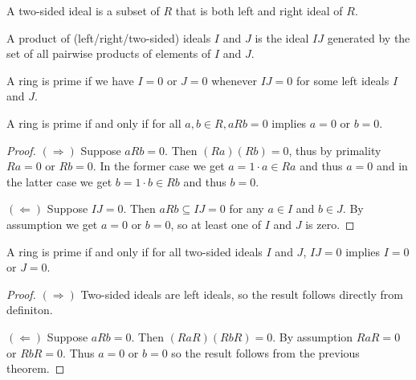 \begin{definition}
  \label{def:two_sided_ideal}
  A two-sided ideal is a subset of $R$ that is both left and right ideal of $R$.
\end{definition}

\begin{definition}
  \label{def:product_of_ideals}
  A product of (left/right/two-sided) ideals $I$ and $J$ is the ideal $IJ$ generated by the set of all pairwise products of elements of $I$ and $J$.
\end{definition}

\begin{definition}
  \label{def:IsPrimeRing}
  \leanok
  A ring is prime if we have $I = 0$ or $J = 0$ whenever $IJ = 0$ for some left ideals $I$ and $J$.
\end{definition}

\begin{theorem}
  \label{thm:prime_ring_equiv}
  \leanok
  A ring is prime if and only if for all $a, b \in R, aRb = 0$ implies $a = 0$ or $b = 0$.
\end{theorem}
\begin{proof}
  \leanok
  $(\Rightarrow)$ Suppose $aRb = 0$. Then $(Ra)(Rb) = 0$, thus by primality $Ra = 0$ or $Rb = 0$. In the former case we get $a = 1 \cdot a \in Ra$ and thus $a = 0$ and in the latter case we get $b = 1 \cdot b \in Rb$ and thus $b = 0$.

  $(\Leftarrow)$ Suppose $IJ = 0$. Then $aRb  \subseteq IJ = 0$ for any $a \in I$ and $b \in J$. By assumption we get $a = 0$ or $b = 0$, so at least one of $I$ and $J$ is zero.
\end{proof}

\begin{theorem}
  \label{thm:prime_ring_equiv'}
  \leanok
  A ring is prime if and only if for all two-sided ideals $I$ and $J$, $IJ = 0$ implies $I = 0$ or $J = 0$.
\end{theorem}
\begin{proof}
  \leanok
  $(\Rightarrow)$ Two-sided ideals are left ideals, so the result follows directly from definiton.

  $(\Leftarrow)$ Suppose $aRb = 0$. Then $(RaR)(RbR) = 0$. By assumption $RaR = 0$ or $RbR = 0$. Thus $a = 0$ or $b = 0$ so the result follows from the previous theorem.
\end{proof}

